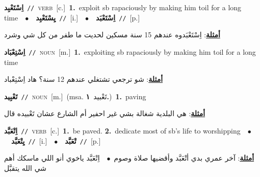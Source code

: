 \documentclass[10pt,a4paper,twoside]{article} %
\begin{document}
\begin{multicols}{2}
{{\setlength\topsep{0pt}\textbf{\foreignlanguage{arabic}{اِسْتَعْبِد}}\ {\color{gray}\texttt{//}\color{black}}\ \textsc{verb}\ [c.]\ \textbf{1.}~exploit sb rapaciously by making him toil for a long time\ \ $\bullet$\ \ \setlength\topsep{0pt}\textbf{\foreignlanguage{arabic}{يِسْتَعْبِد}}\ {\color{gray}\texttt{//}\color{black}}\ [i.]\ \ $\bullet$\ \ \setlength\topsep{0pt}\textbf{\foreignlanguage{arabic}{اِسْتَعْبَد}}\ {\color{gray}\texttt{//}\color{black}}\ [p.]\  \begin{flushright}\color{gray}\foreignlanguage{arabic}{\textbf{\underline{\foreignlanguage{arabic}{أمثلة}}}: اِسْتَعْبَدوه عندهم 15 سنة مسكين لحديت ما طفر من كل شي وشرد}\end{flushright}\color{black}} \vspace{2mm}

{\setlength\topsep{0pt}\textbf{\foreignlanguage{arabic}{اِسْتِعْبَاد}}\ {\color{gray}\texttt{//}\color{black}}\ \textsc{noun}\ [m.]\ \textbf{1.}~exploiting sb rapaciously by making him toil for a long time\  \begin{flushright}\color{gray}\foreignlanguage{arabic}{\textbf{\underline{\foreignlanguage{arabic}{أمثلة}}}: شو ترجعي تشتغلي عندهم 12 سنة؟ هاد اِسْتِعْباد}\end{flushright}\color{black}} \vspace{2mm}

{\setlength\topsep{0pt}\textbf{\foreignlanguage{arabic}{تَعْبِيد}}\ {\color{gray}\texttt{//}\color{black}}\ \textsc{noun}\ [m.]\ \color{gray}(msa. \foreignlanguage{arabic}{تَعْبيد}~\foreignlanguage{arabic}{\textbf{١.}})\color{black}\ \textbf{1.}~paving\  \begin{flushright}\color{gray}\foreignlanguage{arabic}{\textbf{\underline{\foreignlanguage{arabic}{أمثلة}}}: هي البلدية شغالة بشي غير احفير أم الشارع عشان تَعْبيده قال}\end{flushright}\color{black}} \vspace{2mm}

{\setlength\topsep{0pt}\textbf{\foreignlanguage{arabic}{اِتْعَبَّد}}\ {\color{gray}\texttt{//}\color{black}}\ \textsc{verb}\ [c.]\ \textbf{1.}~be paved.  \textbf{2.}~dedicate most of sb's life to worshipping\ \ $\bullet$\ \ \setlength\topsep{0pt}\textbf{\foreignlanguage{arabic}{يِتْعَبَّد}}\ {\color{gray}\texttt{//}\color{black}}\ [i.]\ \ $\bullet$\ \ \setlength\topsep{0pt}\textbf{\foreignlanguage{arabic}{تْعَبَّد}}\ {\color{gray}\texttt{//}\color{black}}\ [p.]\  \begin{flushright}\color{gray}\foreignlanguage{arabic}{\textbf{\underline{\foreignlanguage{arabic}{أمثلة}}}: آخر عمري بدي أتْعَبَّد وأقضيها صلاة وصوم\ $\bullet$\ \  اِتْعَبَّد ياخوي أنو اللي ماسكك أهم شي الله يتقبَّل}\end{flushright}\color{black}} \vspace{2mm}

}
\end{multicols}
\end{document}
